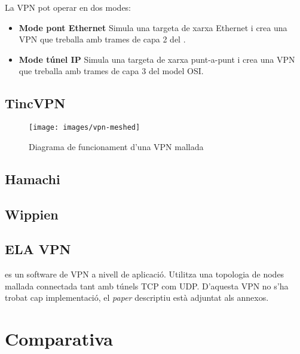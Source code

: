 La VPN pot operar en dos modes:
\begin{itemize}
\item \textbf{Mode pont Ethernet}
Simula una targeta de xarxa Ethernet i crea una VPN que treballa amb trames de capa 2 del .
\item \textbf{Mode túnel IP}
Simula una targeta de xarxa punt-a-punt i crea una VPN que treballa amb trames de capa 3 del model OSI.
\end{itemize}
\subsection{TincVPN}
\begin{figure}[htb]
\centering
\texttt{[image: images/vpn-meshed]}
\caption{Diagrama de funcionament d'una VPN mallada}
\label{F:vpn-meshed}
\end{figure}

\subsection{Hamachi}
\subsection{Wippien}
\subsection{ELA VPN}
 es un software de VPN a nivell de aplicació.
Utilitza una topologia de nodes mallada connectada tant amb túnels TCP com UDP.
D'aquesta VPN no s'ha trobat cap implementació, el \emph{paper} descriptiu està adjuntat als annexos.
\section{Comparativa}

